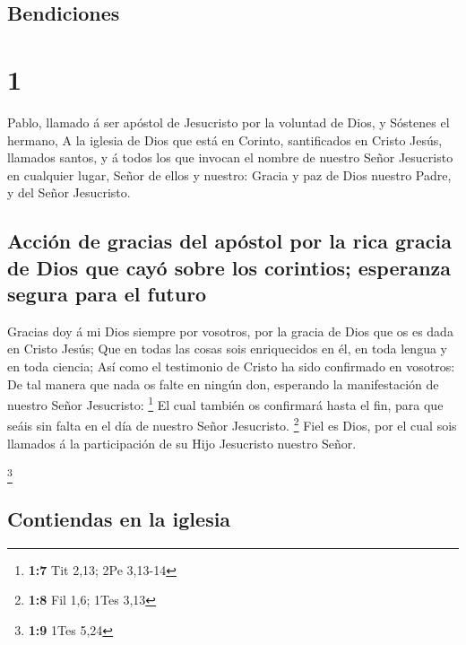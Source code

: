 \hypertarget{bendiciones}{%
\subsection{Bendiciones}\label{bendiciones}}

\hypertarget{section}{%
\section{1}\label{section}}

 Pablo, llamado á ser apóstol de Jesucristo por la
voluntad de Dios, y Sóstenes el hermano,  A la iglesia de
Dios que está en Corinto, santificados en Cristo Jesús, llamados santos,
y á todos los que invocan el nombre de nuestro Señor Jesucristo en
cualquier lugar, Señor de ellos y nuestro:  Gracia y paz
de Dios nuestro Padre, y del Señor Jesucristo.

\hypertarget{acciuxf3n-de-gracias-del-apuxf3stol-por-la-rica-gracia-de-dios-que-cayuxf3-sobre-los-corintios-esperanza-segura-para-el-futuro}{%
\subsection{Acción de gracias del apóstol por la rica gracia de Dios que
cayó sobre los corintios; esperanza segura para el
futuro}\label{acciuxf3n-de-gracias-del-apuxf3stol-por-la-rica-gracia-de-dios-que-cayuxf3-sobre-los-corintios-esperanza-segura-para-el-futuro}}

 Gracias doy á mi Dios siempre por vosotros, por la gracia
de Dios que os es dada en Cristo Jesús;  Que en todas las
cosas sois enriquecidos en él, en toda lengua y en toda ciencia;
 Así como el testimonio de Cristo ha sido confirmado en
vosotros:  De tal manera que nada os falte en ningún don,
esperando la manifestación de nuestro Señor Jesucristo: \footnote{\textbf{1:7}
  Tit 2,13; 2Pe 3,13-14}  El cual también os confirmará
hasta el fin, para que seáis sin falta en el día de nuestro Señor
Jesucristo. \footnote{\textbf{1:8} Fil 1,6; 1Tes 3,13} 
Fiel es Dios, por el cual sois llamados á la participación de su Hijo
Jesucristo nuestro Señor.

\footnote{\textbf{1:9} 1Tes 5,24}

\hypertarget{contiendas-en-la-iglesia}{%
\subsection{Contiendas en la iglesia}\label{contiendas-en-la-iglesia}}

